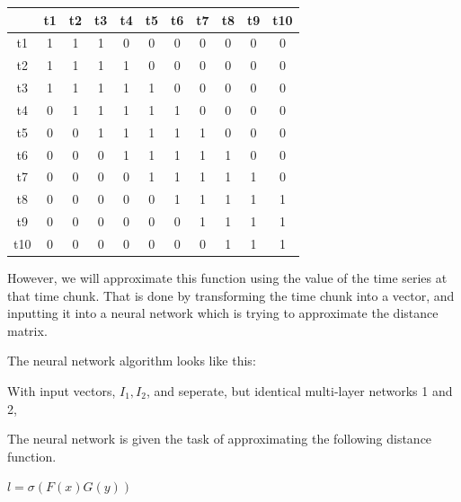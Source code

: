 \documentclass{article}
\begin{document}
\begin{tabular}{|c|c|c|c|c|c|c|c|c|c|c|}
	\hline 
	& t1 & t2 & t3 & t4 & t5 & t6 & t7 & t8 & t9 & t10\\ \hline 
	t1 & 1 & 1 & 1 & 0 & 0 & 0 & 0 & 0 & 0 & 0\\ \hline 
	t2 & 1 & 1 & 1 & 1 & 0 & 0 & 0 & 0 & 0 & 0\\ \hline 
	t3 & 1 & 1 & 1 & 1 & 1 & 0 & 0 & 0 & 0 & 0\\ \hline 
	t4 & 0 & 1 & 1 & 1 & 1 & 1 & 0 & 0 & 0 & 0\\ \hline 
	t5 & 0 & 0 & 1 & 1 & 1 & 1 & 1 & 0 & 0 & 0\\ \hline 
	t6 & 0 & 0 & 0 & 1 & 1 & 1 & 1 & 1 & 0 & 0\\ \hline 
	t7 & 0 & 0 & 0 & 0 & 1 & 1 & 1 & 1 & 1 & 0\\ \hline 
	t8 & 0 & 0 & 0 & 0 & 0 & 1 & 1 & 1 & 1 & 1\\ \hline 
	t9 & 0 & 0 & 0 & 0 & 0 & 0 & 1 & 1 & 1 & 1\\ \hline 
	t10 & 0 & 0 & 0 & 0 & 0 & 0 & 0 & 1 & 1 & 1\\ \hline 
\end{tabular}

However, we will approximate this function using the value of the time series at that time chunk. That is done by transforming the time chunk into a vector, and inputting it into a neural network which is trying to approximate the distance matrix. 

The neural network algorithm looks like this:

With input vectors, $I_1, I_2$, and seperate, but identical multi-layer networks 1 and 2, 	



The neural network is given the task of approximating the following distance function. 


$l = \sigma(F(x) G(y))$


{}

\end{document}

